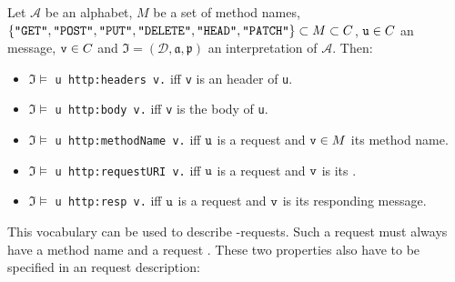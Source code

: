 \begin{definition}
Let $\mathcal{A}$ be an \nthree alphabet,
$M$ be a set of \http method names,
$\{ \texttt{"GET"},\texttt{"POST"},\texttt{"PUT"},\linebreak[1]
\texttt{"DELETE"},\texttt{"HEAD"},\texttt{"PATCH"}\}\subset M \subset C$,
$\verb!u!\in C$ an \http message,
$\verb!v!\in C$
and $\mathfrak{I}=(\mathcal{D},\mathfrak{a,p})$ an interpretation of $\mathcal{A}$.
Then:


\begin{itemize}
 \item  $\mathfrak{I}\models$ \verb!u http:headers v.! iff \texttt{v} is an \http header of \verb!u!.
 \item $\mathfrak{I}\models$ \verb!u http:body v.! iff \verb!v! is the \http body of \verb!u!. 
  \item $\mathfrak{I}\models$ \verb!u http:methodName v.! iff $\verb!u!$ is a request and 
  $\verb!v!\in M$ its method name.
  \item $\mathfrak{I}\models$ \verb!u http:requestURI v.! iff $\verb!u!$ is a request and $\verb!v!$ is its \URL.
  \item $\mathfrak{I}\models$ \verb!u http:resp v.! iff $\verb!u!$ is a request and $\verb!v!$ is its responding \http message.
\end{itemize}
\end{definition}

%  

This vocabulary can be used to describe \http-requests.  Such a request must always have a method name and a request \uri.
These two properties also have to be specified in an \http request description:

